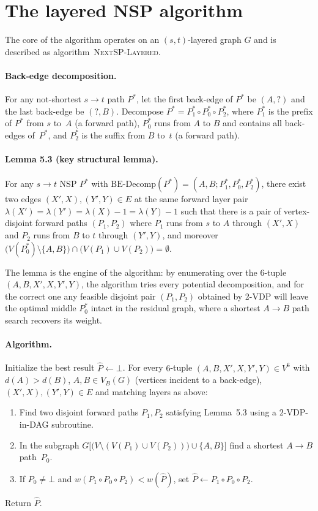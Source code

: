 \section{The layered NSP algorithm}

The core of the algorithm operates on an $(s,t)$-layered graph $G$ and is
described as algorithm~\textsc{NextSP-Layered}.

\paragraph{Back-edge decomposition.} For any not-shortest $s\to t$ path
$P^{*}$, let the first back-edge of $P^{*}$ be $(A,?)$ and the last back-edge
be $(?,B)$. Decompose $P^{*} = P_1^{*} \circ P_0^{*} \circ P_2^{*}$, where
$P_1^{*}$ is the prefix of $P^{*}$ from $s$ to~$A$ (a forward path),
$P_0^{*}$ runs from $A$ to $B$ and contains all back-edges of~$P^{*}$, and
$P_2^{*}$ is the suffix from $B$ to~$t$ (a forward path).

\paragraph{Lemma 5.3 (key structural lemma).} For any $s\to t$ NSP
$P^{*}$ with $\text{BE-Decomp}(P^{*}) = (A,B; P_1^{*}, P_0^{*}, P_2^{*})$,
there exist two edges $(X',X),(Y',Y)\in E$ at the same forward layer pair
$\lambda(X')=\lambda(Y')=\lambda(X)-1=\lambda(Y)-1$ such that there is a
pair of vertex-disjoint forward paths $(P_1,P_2)$ where $P_1$ runs from $s$
to $A$ through $(X',X)$ and $P_2$ runs from $B$ to $t$ through $(Y',Y)$, and
moreover $\bigl(V(P_0^{*})\setminus\{A,B\}\bigr)\cap\bigl(V(P_1)\cup
V(P_2)\bigr) = \emptyset$.

The lemma is the engine of the algorithm: by enumerating over the
$6$-tuple $(A,B,X',X,Y',Y)$, the algorithm tries every potential
decomposition, and for the correct one any feasible disjoint pair
$(P_1,P_2)$ obtained by 2-VDP will leave the optimal middle $P_0^{*}$ intact
in the residual graph, where a shortest $A\to B$ path search recovers its
weight.

\paragraph{Algorithm.} Initialize the best result $\widehat P\gets\bot$.
For every $6$-tuple $(A,B,X',X,Y',Y)\in V^{6}$ with $d(A)>d(B)$,
$A,B\in V_B(G)$ (vertices incident to a back-edge), $(X',X),(Y',Y)\in E$ and
matching layers as above:
\begin{enumerate}
  \item Find two disjoint forward paths $P_1,P_2$ satisfying Lemma~5.3 using
    a $2$-VDP-in-DAG subroutine.
  \item In the subgraph $G\bigl[\bigl(V\setminus(V(P_1)\cup
    V(P_2))\bigr)\cup\{A,B\}\bigr]$ find a shortest $A\to B$ path~$P_0$.
  \item If $P_0\neq\bot$ and $w(P_1\circ P_0\circ P_2)<w(\widehat P)$, set
    $\widehat P\gets P_1\circ P_0\circ P_2$.
\end{enumerate}
Return $\widehat P$.

